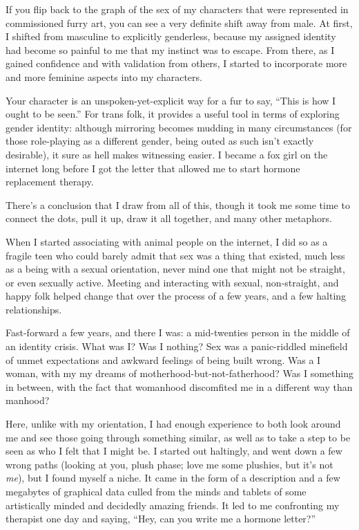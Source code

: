 If you flip back to the graph of the sex of my characters that were represented in commissioned furry art, you can see a very definite shift away from male. At first, I shifted from masculine to explicitly genderless, because my assigned identity had become so painful to me that my instinct was to escape. From there, as I gained confidence and with validation from others, I started to incorporate more and more feminine aspects into my characters.

Your character is an unspoken-yet-explicit way for a fur to say, ``This is how I ought to be seen.''  For trans folk, it provides a useful tool in terms of exploring gender identity: although mirroring becomes mudding in many circumstances (for those role-playing as a different gender, being outed as such isn't exactly desirable), it sure as hell makes witnessing easier. I became a fox girl on the internet long before I got the letter that allowed me to start hormone replacement therapy.

There's a conclusion that I draw from all of this, though it took me some time to connect the dots, pull it up, draw it all together, and many other metaphors.

When I started associating with animal people on the internet, I did so as a fragile teen who could barely admit that sex was a thing that existed, much less as a being with a sexual orientation, never mind one that might not be straight, or even sexually active. Meeting and interacting with sexual, non-straight, and happy folk helped change that over the process of a few years, and a few halting relationships.

Fast-forward a few years, and there I was: a mid-twenties person in the middle of an identity crisis. What was I?  Was I nothing?  Sex was a panic-riddled minefield of unmet expectations and awkward feelings of being built wrong. Was a I woman, with my my dreams of motherhood-but-not-fatherhood?  Was I something in between, with the fact that womanhood discomfited me in a different way than manhood?

Here, unlike with my orientation, I had enough experience to both look around me and see those going through something similar, as well as to take a step to be seen as who I felt that I might be. I started out haltingly, and went down a few wrong paths (looking at you, plush phase; love me some plushies, but it's not \textit{me}), but I found myself a niche. It came in the form of a description and a few megabytes of graphical data culled from the minds and tablets of some artistically minded and decidedly amazing friends. It led to me confronting my therapist one day and saying, ``Hey, can you write me a hormone letter?''

